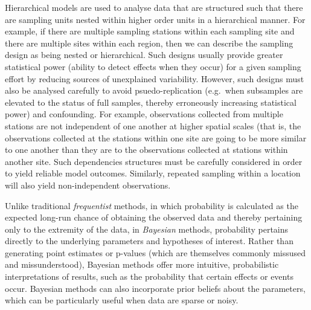 \documentclass[
  8pt,
  a4paper]{article}
\begin{document}
\begin{tcolorbox}[enhanced jigsaw, toptitle=1mm, arc=.35mm, opacitybacktitle=0.6, breakable, colbacktitle=quarto-callout-note-color!10!white, title=\textcolor{quarto-callout-note-color}{\faInfo}\hspace{0.5em}{Bayesian hierarchical models}, leftrule=.75mm, bottomrule=.15mm, colframe=quarto-callout-note-color-frame, colback=white, coltitle=black, bottomtitle=1mm, rightrule=.15mm, titlerule=0mm, opacityback=0, left=2mm, toprule=.15mm]

Hierarchical models are used to analyse data that are structured such
that there are sampling units nested within higher order units in a
hierarchical manner. For example, if there are multiple sampling
stations within each sampling site and there are multiple sites within
each region, then we can describe the sampling design as being nested or
hierarchical. Such designs usually provide greater statistical power
(ability to detect effects when they occur) for a given sampling effort
by reducing sources of unexplained variability. However, such designs
must also be analysed carefully to avoid psuedo-replication (e.g.~when
subsamples are elevated to the status of full samples, thereby
erroneously increasing statistical power) and confounding. For example,
observations collected from multiple stations are not independent of one
another at higher spatial scales (that is, the observations collected at
the stations within one site are going to be more similar to one another
than they are to the observations collected at stations within another
site. Such dependencies structures must be carefully considered in order
to yield reliable model outcomes. Similarly, repeated sampling within a
location will also yield non-independent observations.

Unlike traditional \emph{frequentist} methods, in which probability is
calculated as the expected long-run chance of obtaining the observed
data and thereby pertaining only to the extremity of the data, in
\emph{Bayesian} methods, probability pertains directly to the underlying
parameters and hypotheses of interest. Rather than generating point
estimates or p-values (which are themselves commonly missused and
missunderstood), Bayesian methods offer more intuitive, probabilistic
interpretations of results, such as the probability that certain effects
or events occur. Bayesian methods can also incorporate prior beliefs
about the parameters, which can be particularly useful when data are
sparse or noisy.


\end{tcolorbox}
\end{document}
